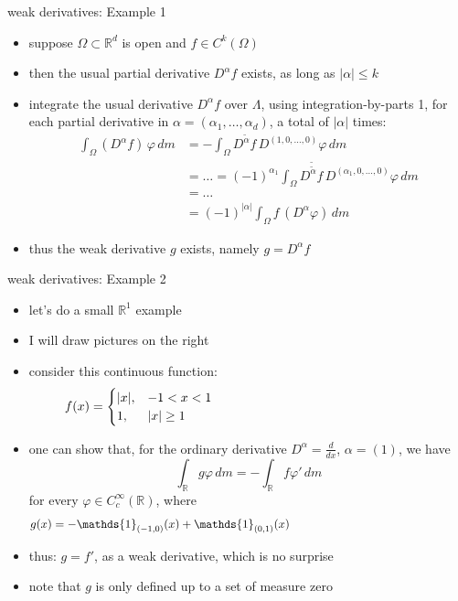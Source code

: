 \documentclass[10pt,
               svgnames,
               hyperref={colorlinks,
                         citecolor=DeepPink4,
                         linkcolor=FireBrick,
                         urlcolor=blue},
               usepdftitle=false]{beamer}
\newcommand{\RR}{\mathbb{R}}
\newcommand{\one}{\mathds{1}}
\begin{document}
\begin{frame}{weak derivatives: Example 1}

\begin{itemize}
\item suppose $\Omega \subset \RR^d$ is open and $f\in C^k(\Omega)$
\item then the usual partial derivative $D^\alpha f$ exists, as long as $|\alpha|\le k$
\item integrate the usual derivative $D^\alpha f$ over $\Lambda$, using integration-by-parts 1, for each partial derivative in $\alpha=(\alpha_1,\dots,\alpha_d)$, a total of $|\alpha|$ times:
\begin{align*}
\int_\Omega \left(D^\alpha f\right)\, \varphi\,dm &= - \int_\Omega D^{\tilde\alpha} f\, D^{(1,0,\dots,0)}\varphi\,dm \\
 &= \dots = (-1)^{\alpha_1} \int_\Omega D^{\tilde{\tilde\alpha}} f \, D^{(\alpha_1,0,\dots,0)}\varphi\,dm \\
 &= \dots \\
 &= (-1)^{|\alpha|} \int_\Omega f\, \left(D^\alpha \varphi\right)\,dm
\end{align*}
\item thus the weak derivative $g$ exists, namely $g=D^\alpha f$
\end{itemize}
\end{frame}


\begin{frame}{weak derivatives: Example 2}

\begin{itemize}
\item let's do a small $\RR^1$ example
\item I will draw pictures on the right
\item consider this continuous function:
	$$f(x) = \begin{cases} |x|, & -1 < x < 1 \\ 1, & |x| \ge 1 \end{cases} \hspace{60mm}$$
\item one can show that, for the ordinary derivative $D^{\alpha} = \frac{d}{dx}$, $\alpha=(1)$, we have
	$$\int_\RR g \varphi \,dm = -\int_\RR f \varphi' \,dm$$
for every $\varphi \in C_c^\infty(\RR)$, where
	$$g(x) = -\one_{(-1,0)}(x) + \one_{(0,1)}(x) \hspace{60mm}$$
\item thus: $g = f'$, as a weak derivative, which is no surprise
\item note that $g$ is only defined up to a set of measure zero
\end{itemize}
\end{frame}
\end{document}
